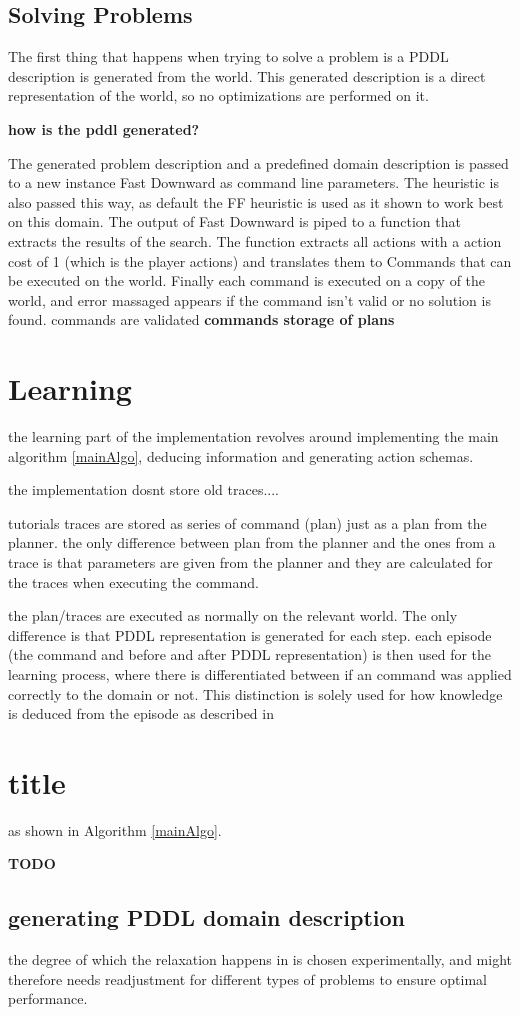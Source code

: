 	\subsection{Solving Problems}
	The first thing that happens when trying to solve a problem is a PDDL description is generated from the world. This generated description is a direct representation of the world, so no optimizations are performed on it.
	
	\textbf{\huge how is the pddl generated?}

	The generated problem description and a predefined domain description is passed to a new instance Fast Downward as command line parameters. The heuristic is also passed this way, as default the FF heuristic is used as it shown to work best on this domain. The output of Fast Downward is piped to a function that extracts the results of the search. The function extracts all actions with a action cost of 1 (which is the player actions) and translates them to Commands that can be executed on the world. Finally each command is executed on a copy of the world, and error massaged appears if the command isn't valid or no solution is found. 
	commands are validated
	\textbf{\huge commands storage of plans}
	
\section{Learning}
	the learning part of the implementation revolves around implementing the main algorithm \ref{mainAlgo}, deducing information and generating action schemas.
	
	the implementation dosnt store old traces....
	
	tutorials traces are stored as series of command (plan) just as a plan from the planner. the only difference between plan from the planner and the ones from a trace is that parameters are given from the planner and they are calculated for the traces when executing the command.

	the plan/traces are executed as normally on the relevant world. The only difference is that PDDL representation is generated for each step. each episode (the command and before and after PDDL representation) is then used for the learning process, where there is differentiated between if an command was applied correctly to the domain or not. This distinction is solely used for how knowledge is deduced from the episode as described in \section{title}
	
	
	
	as shown in Algorithm \ref{mainAlgo}. 
	
	\textbf{\huge TODO}
	
	
	\subsection{generating PDDL domain description}
	the degree of which the relaxation happens in is chosen experimentally, and might therefore needs readjustment for different types of problems to ensure optimal performance.
	